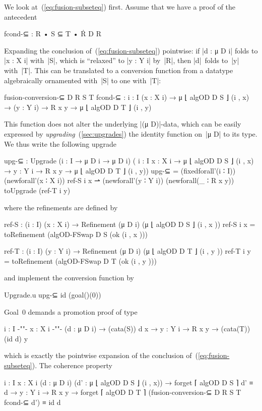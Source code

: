 We look at~(\ref{eq:fusion-subseteq}) first.
Assume that we have a proof of the antecedent
\begin{code}
fcond-⊆ : R • S ⊆ T • Ṙ D R
\end{code}
Expanding the conclusion of~(\ref{eq:fusion-subseteq}) pointwise: if |d : μ D i| folds to |x : X i| with~|S|, which is ``relaxed'' to |y : Y i| by~|R|, then |d|~folds to~|y| with~|T|.
This can be translated to a conversion function from a datatype algebraically ornamented with~|S| to one with~|T|:
\begin{code}
fusion-conversion-⊆ D R S T fcond-⊆ :
  {i : I} (x : X i) → μ ⌊ algOD D S ⌋ (i , x) →
  (y : Y i) → R x y → μ ⌊ algOD D T ⌋ (i , y)
\end{code}
This function does not alter the underlying |(μ D)|-data, which can be easily expressed by \emph{upgrading}~(\autoref{sec:upgrades}) the identity function on~|μ D| to its type.
We thus write the following upgrade
\begin{code}
upg-⊆ : Upgrade  ({i : I} → μ D i → μ D i)
                 (  {i : I} {x : X i} → μ ⌊ algOD D S ⌋ (i , x) →
                    {y : Y i} → R x y  → μ ⌊ algOD D T ⌋ (i , y))
upg-⊆ =  (fixedforall'(i ∶ I)) (newforall'(x ∶ X i)) ref-S i x ⇀ 
         (newforall'(y ∶ Y i)) (newforall(_ ∶ R x y)) toUpgrade (ref-T i y)
\end{code}
where the refinements are defined by
\begin{code}
ref-S  : (i : I) (x : X  i) → Refinement (μ D i) (μ ⌊ algOD D S  ⌋ (i , x  ))
ref-S   i x  = toRefinement (algOD-FSwap D S  (ok (i , x  )))

ref-T  : (i : I) (y : Y  i) → Refinement (μ D i) (μ ⌊ algOD D T  ⌋ (i , y  ))
ref-T   i y  = toRefinement (algOD-FSwap D T  (ok (i , y  )))
\end{code}
and implement the conversion function by
\begin{code}
Upgrade.u upg-⊆ id (goal()(0))
\end{code}
Goal~0 demands a promotion proof of type
\begin{code}
{i : I} {-"\kern-1pt"-} {x : X i} {-"\kern-1pt"-} (d : μ D i) → (cata(S)) d x → {y : Y i} → R x y → (cata(T)) (id d) y
\end{code}
which is exactly the pointwise expansion of the conclusion of~(\ref{eq:fusion-subseteq}).
The coherence property
\begin{code}
{i : I} {x : X i} (d : μ D i) (d' : μ ⌊ algOD D S ⌋ (i , x)) →
  forget ⌈ algOD D S ⌉ d' ≡ d →
{y : Y i} → R x y →
  forget ⌈ algOD D T ⌉ (fusion-conversion-⊆ D R S T fcond-⊆ d') ≡ id d
\end{code}
